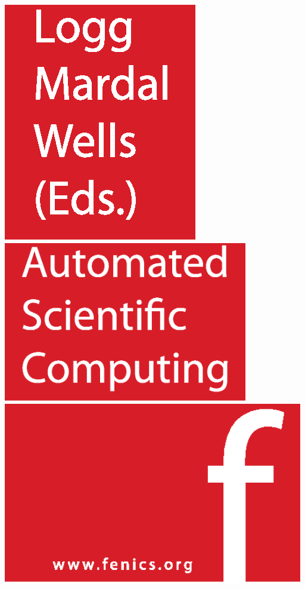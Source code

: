 \pagestyle{empty}

\pagecolor{fenicsred}
\hfill
\includegraphics{frontmatter/eps/editors.eps} \\
\includegraphics[height=7cm]{frontmatter/eps/title.eps}
\vfill
\hfill
\includegraphics[height=8cm]{frontmatter/eps/f.eps}
\thispagestyle{empty}
\newpage
\pagecolor{white}

